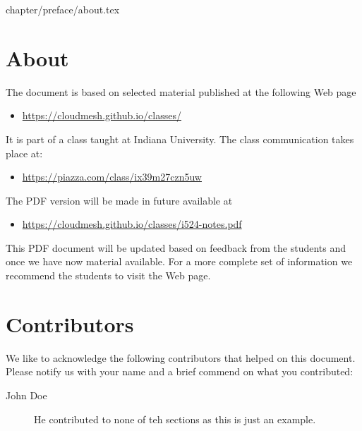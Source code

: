 \begin{fileremark}chapter/preface/about.tex\end{fileremark}

\section{About}\label{about}

The document is based on selected material published at the following
Web page

\begin{itemize}
\item
  \url{https://cloudmesh.github.io/classes/}
\end{itemize}

It is part of a class taught at Indiana University. The class
communication takes place at:

\begin{itemize}
\item
  \url{https://piazza.com/class/ix39m27czn5uw}
\end{itemize}

The PDF version will be made in future available at 

\begin{itemize}
\item
  \url{https://cloudmesh.github.io/classes/i524-notes.pdf}
\end{itemize}

This PDF document will be updated based on feedback from the students
and once we have now material available. For a more complete set of
information we recommend the students to visit the Web page.

\section{Contributors}

We like to acknowledge the following contributors that helped on this
document. Please notify us with your name and a brief commend on what
you contributed:

\begin{description}
\item[John Doe] He contributed to none of teh sections as this is just
  an example.
\end{description}
